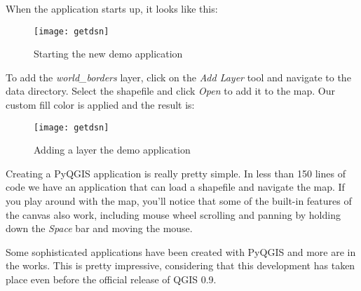 When the application starts up, it looks like this:

\begin{figure}[ht]
\begin{center}
  \caption{Starting the new demo application}\label{fig:demo_app_startup}\smallskip
  \texttt{[image: getdsn]}
\end{center}
\end{figure}

To add the \textsl{world\_borders} layer, click on the \textsl{Add Layer} tool and navigate to the data directory.
Select the shapefile and click \textsl{Open} to add it to the map. Our custom fill color is applied and the result is:

\begin{figure}[ht]
\begin{center}
  \caption{Adding a layer the demo application}\label{fig:demo_app_done}\smallskip
  \texttt{[image: getdsn]}
\end{center}
\end{figure}

Creating a PyQGIS application is really pretty simple. In less than 150 lines of code we have an application that can
load a shapefile and navigate the map. If you play around with the map, you'll notice that some of the built-in features
of the canvas also work, including mouse wheel scrolling and panning by holding down the \textsl{Space} bar and
moving the mouse.

Some sophisticated applications have been created with PyQGIS and more are in the works. This is pretty impressive,
considering that this development has taken place even before the official release of QGIS 0.9.

\begin{Tip}\caption{\textsc{Documentation For PyQGIS}}
\end{Tip} 
